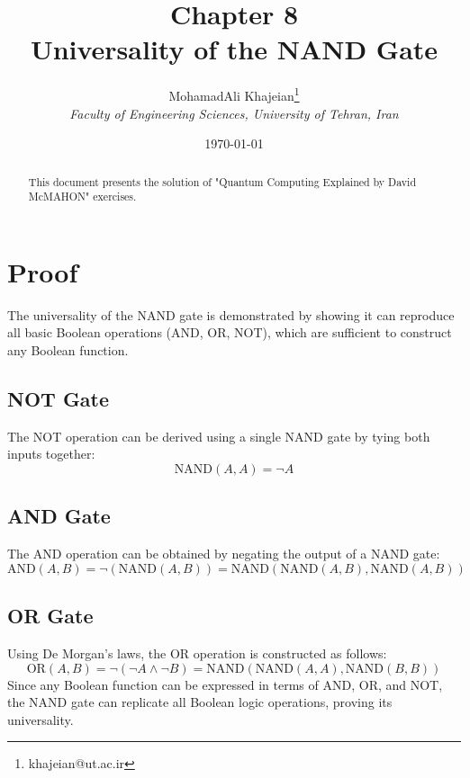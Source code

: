 \documentclass{article}
\title{\textbf{Chapter 8} \\ \small Universality of the NAND Gate}
\author{
    MohamadAli Khajeian\footnote{khajeian@ut.ac.ir} \\ 
    \small \textit{Faculty of Engineering Sciences, University of Tehran, Iran} \\ 
}
\date{\today}
\begin{document}
\maketitle

\begin{abstract}
    This document presents the solution of "Quantum Computing Explained by David McMAHON" exercises.
\end{abstract}

\section*{Proof}

The universality of the NAND gate is demonstrated by showing it can reproduce all basic Boolean operations (AND, OR, NOT), which are sufficient to construct any Boolean function.

\subsection*{NOT Gate}
The NOT operation can be derived using a single NAND gate by tying both inputs together:
\[
\text{NAND}(A, A) = \neg A
\]

\subsection*{AND Gate}
The AND operation can be obtained by negating the output of a NAND gate:
\[
\text{AND}(A, B) = \neg(\text{NAND}(A, B)) = \text{NAND}(\text{NAND}(A, B), \text{NAND}(A, B))
\]

\subsection*{OR Gate}
Using De Morgan's laws, the OR operation is constructed as follows:
\[
\text{OR}(A, B) = \neg(\neg A \land \neg B) = \text{NAND}(\text{NAND}(A, A), \text{NAND}(B, B))
\]
Since any Boolean function can be expressed in terms of AND, OR, and NOT, the NAND gate can replicate all Boolean logic operations, proving its universality.
\end{document}
